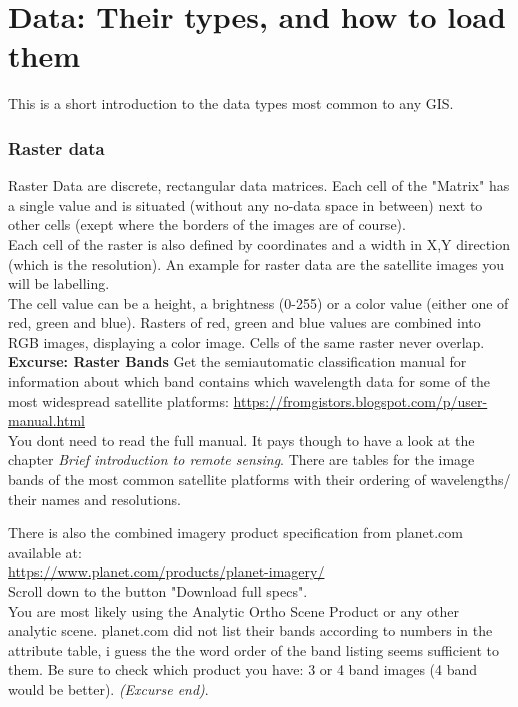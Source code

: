 \documentclass[12pt,a4paper]{scrartcl}
\begin{document}
\section{Data: Their types, and how to load them}
This is a short introduction to the data types most common to any GIS.

\subsubsection{Raster data}
\label{rastabands}
Raster Data are discrete, rectangular data matrices.
Each cell of the "Matrix" has a single value and is situated (without any no-data space in between) next to other cells (exept where the borders of the images are of course). \\
Each cell of the raster is also defined by coordinates and a width in X,Y direction (which is the resolution).
An example for raster data are the satellite images you will be labelling. \\

The cell value can be a height, a brightness (0-255) or a color value (either one of red, green and blue).
Rasters of red, green and blue values are combined into RGB images, displaying a color image.  
Cells of the same raster never overlap. \\

\textbf{Excurse: Raster Bands} \newline
Get the semiautomatic classification manual for information about which band contains which wavelength data for 
some of the most widespread satellite platforms: 
\url{https://fromgistors.blogspot.com/p/user-manual.html}\\

You dont need to read the full manual. 
It pays though to have a look at the chapter \textit{Brief introduction to remote sensing}.
There are tables for the image bands of the most common satellite platforms with their ordering of wavelengths/ their names and resolutions.

There is also the combined imagery product specification from planet.com available at: \\
\url{https://www.planet.com/products/planet-imagery/} \\
Scroll down to the button "Download full specs". \\
You are most likely using the Analytic Ortho Scene Product or any other analytic scene.
planet.com did not list their bands according to numbers in the attribute table, i guess the the word order of the band listing seems sufficient to them.
Be sure to check which product you have: 3 or 4 band images (4 band would be better).  
\textit{(Excurse end)}. \\
\end{document}
